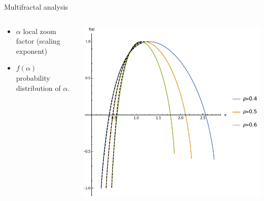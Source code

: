 \documentclass[xcolor=x11names,compress,professionalfonts]{beamer}
\renewcommand{\(}{\begin{columns}}
\renewcommand{\)}{\end{columns}}
\newcommand{\<}[1]{\begin{column}{#1}}
\renewcommand{\>}{\end{column}}
\begin{document}
\begin{frame}{Multifractal analysis}

	\begin{columns}
	\begin{column}{5cm}
	\begin{itemize}
		\item $\alpha$ local zoom factor (scaling exponent)
		\item $f(\alpha)$ probability distribution of $\alpha$.
	\end{itemize}
	
     \end{column}
    
    \begin{column}{5cm}
    {\centering
    	\includegraphics[scale=.5]{f-alpha_04_to_06.pdf}
    	
     }
    \end{column}
   \end{columns}
\end{frame}
\end{document}
